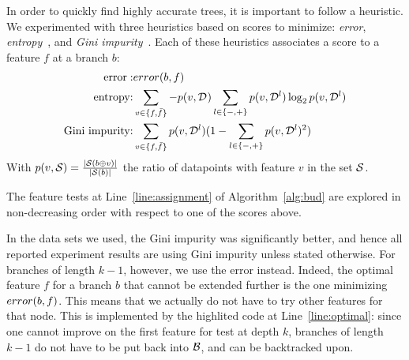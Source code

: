 \documentclass{llncs}
\def\posclass{+}
\def\negclass{-}
\def\datasymb{D}
\newcommand{\setex}[1]{\ensuremath{{\mathcal \datasymb}^{#1}}\xspace}
\newcommand{\allex}{{\setex{}}\xspace}
\newcommand{\bud}[0]{\ensuremath{{\cal B}}}
\newcommand{\afeat}[0]{\ensuremath{f}}
\newcommand{\aclass}[0]{\ensuremath{l}}
\newcommand{\error}[1][]{\ensuremath{\ifthenelse{\equal{#1}{}}{{error}}{{error({{#1}})}}}}
\newcommand{\abranch}[0]{\ensuremath{b}}
\newcommand{\mdepth}[0]{\ensuremath{k}}
\newcommand{\grow}[2]{\ensuremath{{#1}\oplus{#2}}}
\begin{document}
In order to quickly find highly accurate trees, it is important to follow a heuristic. We experimented with three heuristics based on scores to minimize: \emph{error}, \emph{entropy}~\cite{10.1023/A:1022643204877}, and \emph{Gini impurity}~\cite{breiman1984classification}. 
Each of these heuristics associates a score to a feature $\afeat$ at a branch $\abranch$:
\begin{eqnarray}
	\textrm{error}: & \error[\abranch,\afeat] \\
	\textrm{entropy:} & \sum\limits_{v \in \{\afeat,\bar{\afeat}\}} -p(v,\allex) \sum\limits_{\aclass \in \{\negclass,\posclass\}} p(v,\setex{\aclass}) \log_{2} p(v,\setex{\aclass}) \\
	\textrm{Gini impurity:} &  \sum\limits_{v \in \{\afeat,\bar{\afeat}\}} p(v,\setex{\aclass})(1 - \sum\limits_{\aclass \in \{\negclass,\posclass\}} p(v,\setex{\aclass})^2)
\end{eqnarray}
With $p(v,{\cal S}) = \frac{|{\cal S}(\grow{\abranch}{v})|}{|{\cal S}(\abranch)|}$ the ratio of datapoints with feature $v$ in the set ${\cal S}$.

The feature tests at Line~\ref{line:assignment} of Algorithm~\ref{alg:bud} are explored in non-decreasing order with respect to one of the scores above.


In the data sets we used, the Gini impurity was significantly better, and hence all reported experiment results are using Gini impurity unless stated otherwise. For branches of length $\mdepth-1$, however, we use the error instead. Indeed, the optimal feature $\afeat$ for a branch $\abranch$ that cannot be extended further is the one minimizing $\error[\abranch,\afeat]$. This means that we actually do not have to try other features for that node. This is implemented by the highlited code at Line~\ref{line:optimal}: since one cannot improve on the first feature for test at depth $\mdepth$, branches of length $\mdepth-1$ do not have to be put back into \bud, and can be backtracked upon.

\end{document}
